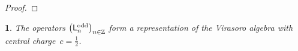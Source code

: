 \documentclass[12pt,oneside,english]{amsart}
\numberwithin{equation}{section}
\numberwithin{figure}{section}
\theoremstyle{plain}
\newtheorem{thm}{\protect\theoremname}
\theoremstyle{plain}
\theoremstyle{plain}
\theoremstyle{plain}
\theoremstyle{remark}
\theoremstyle{definition}
\theoremstyle{plain}
\theoremstyle{plain}
\numberwithin{thm}{section}
\providecommand{\theoremname}{Theorem}
\providecommand{\theoremname}{Theorem}
\providecommand{\theoremname}{Theorem}
\providecommand{\theoremname}{Theorem}
\begin{document}
\begin{proof}
\end{proof}
\begin{thm}
\label{thm:ising-r}The operators
$\left(\mathsf{L}_{n}^{\mathrm{odd}}\right)_{n\in\mathbb{Z} }$
form a representation of the Virasoro algebra with central 
charge~${c=\frac{1}{2}}$. 
\end{thm}
\end{document}
